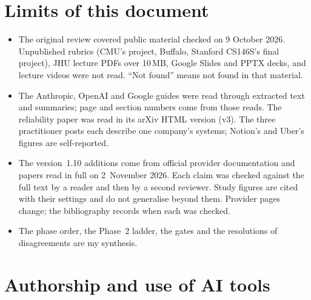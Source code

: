 \documentclass[10pt]{article}
\begin{document}
\section*{Limits of this document}

\begin{itemize}
\item The original review covered public material checked on 9 October 2026. Unpublished rubrics (CMU's project, Buffalo, Stanford CS146S's final project), JHU lecture PDFs over 10\,MB, Google Slides and PPTX decks, and lecture videos were not read. ``Not found'' means not found in that material.
\item The Anthropic, OpenAI and Google guides were read through extracted text and summaries; page and section numbers come from those reads. The reliability paper \cite{reliab} was read in its arXiv HTML version (v3). The three practitioner posts \cite{anthauto,notion,uberskills} each describe one company's systems; Notion's and Uber's figures are self-reported.
\item The version~1.10 additions come from official provider documentation and papers read in full on 2~November 2026. Each claim was checked against the full text by a reader and then by a second reviewer. Study figures are cited with their settings and do not generalise beyond them. Provider pages change; the bibliography records when each was checked.
\item The phase order, the Phase~2 ladder, the gates and the resolutions of disagreements are my synthesis.
\end{itemize}

\section*{Authorship and use of AI tools}
\end{document}
